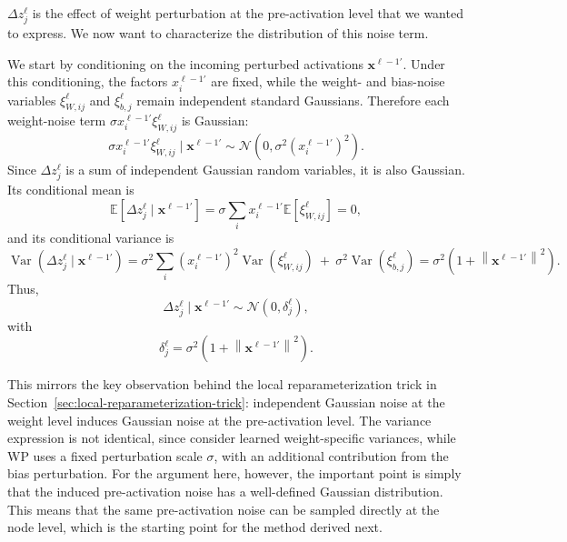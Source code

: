 \(\Delta z^\ell_j\) is the effect of weight perturbation at the pre-activation level that we wanted to express. We now want to characterize the distribution of this noise term.

We start by conditioning on the incoming perturbed activations \(\mathbf{x}^{\ell-1\prime}\). Under this conditioning, the
factors $x^{\ell-1\prime}_i$ are fixed, while the weight- and bias-noise variables
$\xi_{W,ij}^\ell$ and $\xi_{b,j}^\ell$ remain independent standard Gaussians. Therefore each weight-noise term
$\sigma x^{\ell-1\prime}_i \xi_{W,ij}^\ell$ is Gaussian:
\begin{equation}
\sigma x^{\ell-1\prime}_i \xi_{W,ij}^\ell
\mid \mathbf{x}^{\ell-1\prime}
\sim
\mathcal{N}\!\left(0, \sigma^2 (x^{\ell-1\prime}_i)^2\right).
\end{equation}
Since $\Delta z^\ell_j$ is a sum of independent Gaussian random variables, it is also Gaussian.
Its conditional mean is
\begin{equation}
\mathbb{E}\!\left[\Delta z^\ell_j \mid \mathbf{x}^{\ell-1\prime}\right]
=
\sigma \sum_i x^{\ell-1\prime}_i
\mathbb{E}\!\left[\xi_{W,ij}^\ell\right]
=
0,
\end{equation}
and its conditional variance is
\begin{equation}
\operatorname{Var}\!\left(\Delta z^\ell_j \mid \mathbf{x}^{\ell-1\prime}\right)
=
\sigma^2 \sum_i (x^{\ell-1\prime}_i)^2
\operatorname{Var}\!\left(\xi_{W,ij}^\ell\right)
\ +\ 
\sigma^2 \operatorname{Var}\!\left(\xi_{b,j}^\ell\right)
=
\sigma^2 \left(1+\left\|\mathbf{x}^{\ell-1\prime}\right\|^2\right).
\end{equation}
Thus,
\begin{equation}
\Delta z^\ell_j \mid \mathbf{x}^{\ell-1\prime}
\sim
\mathcal{N}(0,\delta^\ell_j),
\end{equation}
with
\begin{equation}
\delta^\ell_j
=
\sigma^2 \left(1+\left\|\mathbf{x}^{\ell-1\prime}\right\|^2\right).
\end{equation}

This mirrors the key observation behind the local reparameterization trick in Section~\ref{sec:local-reparameterization-trick}: independent Gaussian noise at the weight level induces Gaussian noise at the pre-activation level. The variance expression is not identical, since \textcite{kingma_variational_2015} consider learned weight-specific variances, while WP uses a fixed perturbation scale \(\sigma\), with an additional contribution from the bias perturbation. For the argument here, however, the important point is simply that the induced pre-activation noise has a well-defined Gaussian distribution. This means that the same pre-activation noise can be sampled directly at the node level, which is the starting point for the method derived next.
